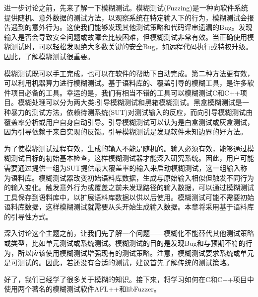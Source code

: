 进一步讨论之前，先来了解一下模糊测试。模糊测试(Fuzzing)是一种向软件系统提供随机、意外数据的测试方法，以观察系统在特定输入下的行为，模糊测试会报告遇到的意外行为。这使我们能够发现其他测试策略和代码评审遗漏的Bug。发现输入是否会导致安全问题或故障会比较困难，但模糊测试非常有效。当正确使用模糊测试时，可以轻松发现绝大多数关键的安全Bug，如远程代码执行或特权升级。因此，了解模糊测试很重要。

模糊测试既可以手工完成，也可以在软件的帮助下自动完成。第二种方法更有效，可以利用机器算力进行模糊测试。基于语料库的、覆盖引导的模糊工具，是许多软件项目必备的工具。幸运的是，我们有相当不错的工具可以模糊测试C和C++项目。模糊处理可以分为两大类:引导模糊测试和黑箱模糊测试。黑盒模糊测试是一种暴力的测试方法，依赖待测系统(SUT)对测试输入的反应，而向引导模糊测试由覆盖率分析或用户自身自动引导。引导模糊测试可以认为是白盒测试或灰盒测试，因为引导依赖于来自实现的反馈。引导模糊测试是发现软件未知边界的好方法。

为了使模糊测试过程有效，生成的输入不能是随机的。输入必须有效，能够通过模糊测试目标的初始基本检查，这样模糊测试器才能深入研究系统。因此，用户可能需要通过提供一组为SUT提供最大覆盖率的输入来启动模糊测试，这一组输入称为语料库。模糊测试器改变初始语料库数据，生成与原始输入相似但触发不同行为的输入变化。触发意外行为或覆盖之前未发现路径的输入数据，可以通过模糊测试工具保存到语料库中，以扩展语料库数据以供以后使用。模糊测试可能不需要初始语料库数据，这样模糊测试就需要从头开始生成输入数据。本章将采用基于语料库的引导性方式。

深入讨论这个主题之前，让我们先了解一个问题——模糊化不能替代其他测试策略或类型，比如单元测试或系统测试。模糊测试的目的是发现Bug和与预期不符的行为，所以应该使用模糊测试增强现有的测试策略。注意，模糊测试要求系统或单元是可测试的。因此，若还没有合适的测试，建议首先了解传统的测试策略。

好了，我们已经学了很多关于模糊的知识。接下来，将学习如何在C和C++项目中使用两个著名的模糊测试软件AFL++和libFuzzer。




























